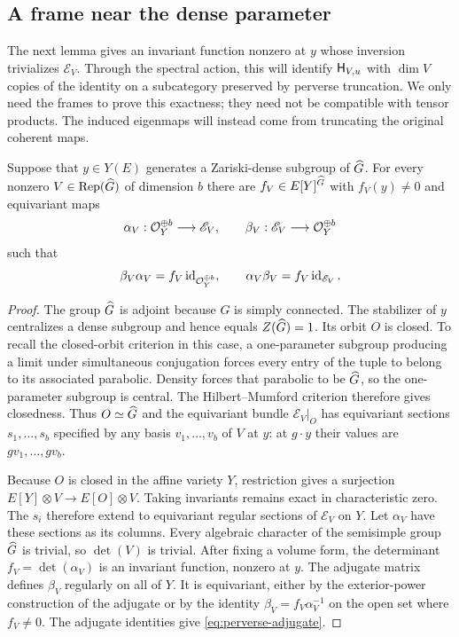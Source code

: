 \subsection{A frame near the dense parameter}

The next lemma gives an invariant function nonzero at $y$ whose inversion
trivializes $\mathscr E_V$.  Through the spectral action, this will identify
$\mathsf H_{V,u}$ with $\dim V$ copies of the identity on a subcategory
preserved by perverse truncation.  We only need the frames to prove this
exactness; they need not be compatible with tensor products.  The induced
eigenmaps will instead come from truncating the original coherent maps.

\begin{lemma}\label{lem:perverse-frame}
Suppose that $y\in Y(E)$ generates a Zariski-dense subgroup of
$\widehat G$.  For every nonzero $V\in\operatorname{Rep}(\widehat G)$ of dimension $b$ there
are $f_V\in E[Y]^{\widehat G}$ with $f_V(y)\ne0$ and equivariant maps
\[
 \alpha_V:\mathcal O_Y^{\oplus b}\longrightarrow\mathscr E_V,
 \qquad
 \beta_V:\mathscr E_V\longrightarrow\mathcal O_Y^{\oplus b}
\]
such that
\begin{equation}\label{eq:perverse-adjugate}
 \beta_V\alpha_V=f_V\operatorname{id}_{\mathcal O_Y^{\oplus b}},
 \qquad
 \alpha_V\beta_V=f_V\operatorname{id}_{\mathscr E_V}.
\end{equation}
\end{lemma}

\begin{proof}
The group $\widehat G$ is adjoint because $G$ is simply connected.  The
stabilizer of $y$ centralizes a dense subgroup and hence equals
$Z(\widehat G)=1$.  Its orbit $O$ is closed.  To recall the closed-orbit
criterion in this case, a one-parameter subgroup producing a limit
under simultaneous conjugation forces every entry of the tuple to
belong to its associated parabolic.  Density forces that parabolic
to be $\widehat G$, so the one-parameter subgroup is central.  The
Hilbert--Mumford criterion therefore gives closedness.  Thus
$O\simeq\widehat G$ and the equivariant bundle $\mathscr E_V|_O$ has
equivariant sections $s_1,\ldots,s_b$ specified by any basis
$v_1,\ldots,v_b$ of $V$ at $y$: at $g\cdot y$ their values are
$g v_1,\ldots,g v_b$.

Because $O$ is closed in the affine variety $Y$, restriction gives a
surjection $E[Y]\otimes V\to E[O]\otimes V$.  Taking invariants
remains exact in characteristic zero.  The $s_i$ therefore extend to
equivariant regular sections of $\mathscr E_V$ on $Y$.  Let
$\alpha_V$ have these sections as its columns.  Every algebraic
character of the semisimple group $\widehat G$ is trivial, so
$\det(V)$ is trivial.  After fixing a volume form, the determinant
$f_V=\det(\alpha_V)$ is an invariant function, nonzero at $y$.
The adjugate matrix defines $\beta_V$ regularly on all of $Y$.
It is equivariant, either by the exterior-power construction of the
adjugate or by the identity
$\beta_V=f_V\alpha_V^{-1}$ on the open set where $f_V\ne0$.
The adjugate identities give \eqref{eq:perverse-adjugate}.
\end{proof}

